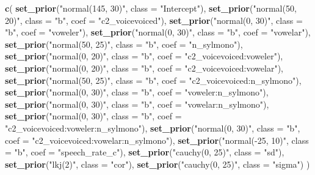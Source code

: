 \documentclass[11pt,]{article}
\newenvironment{Shaded}{\begin{snugshade}}{\end{snugshade}}
\newcommand{\DataTypeTok}[1]{\textcolor[rgb]{0.13,0.29,0.53}{#1}}
\newcommand{\KeywordTok}[1]{\textcolor[rgb]{0.13,0.29,0.53}{\textbf{#1}}}
\newcommand{\NormalTok}[1]{#1}
\newcommand{\StringTok}[1]{\textcolor[rgb]{0.31,0.60,0.02}{#1}}
\begin{document}
\begin{Shaded}
\begin{Highlighting}[]
\KeywordTok{c}\NormalTok{(}
  \KeywordTok{set_prior}\NormalTok{(}\StringTok{"normal(145, 30)"}\NormalTok{, }\DataTypeTok{class =} \StringTok{"Intercept"}\NormalTok{),}
  \KeywordTok{set_prior}\NormalTok{(}\StringTok{"normal(50, 20)"}\NormalTok{, }\DataTypeTok{class =} \StringTok{"b"}\NormalTok{, }\DataTypeTok{coef =} \StringTok{"c2_voicevoiced"}\NormalTok{),}
  \KeywordTok{set_prior}\NormalTok{(}\StringTok{"normal(0, 30)"}\NormalTok{, }\DataTypeTok{class =} \StringTok{"b"}\NormalTok{, }\DataTypeTok{coef =} \StringTok{"voweler"}\NormalTok{),}
  \KeywordTok{set_prior}\NormalTok{(}\StringTok{"normal(0, 30)"}\NormalTok{, }\DataTypeTok{class =} \StringTok{"b"}\NormalTok{, }\DataTypeTok{coef =} \StringTok{"vowelar"}\NormalTok{),}
  \KeywordTok{set_prior}\NormalTok{(}\StringTok{"normal(50, 25)"}\NormalTok{, }\DataTypeTok{class =} \StringTok{"b"}\NormalTok{, }\DataTypeTok{coef =} \StringTok{"n_sylmono"}\NormalTok{),}
  \KeywordTok{set_prior}\NormalTok{(}\StringTok{"normal(0, 20)"}\NormalTok{, }\DataTypeTok{class =} \StringTok{"b"}\NormalTok{, }\DataTypeTok{coef =} \StringTok{"c2_voicevoiced:voweler"}\NormalTok{),}
  \KeywordTok{set_prior}\NormalTok{(}\StringTok{"normal(0, 20)"}\NormalTok{, }\DataTypeTok{class =} \StringTok{"b"}\NormalTok{, }\DataTypeTok{coef =} \StringTok{"c2_voicevoiced:vowelar"}\NormalTok{),}
  \KeywordTok{set_prior}\NormalTok{(}\StringTok{"normal(50, 25)"}\NormalTok{, }\DataTypeTok{class =} \StringTok{"b"}\NormalTok{, }\DataTypeTok{coef =} \StringTok{"c2_voicevoiced:n_sylmono"}\NormalTok{),}
  \KeywordTok{set_prior}\NormalTok{(}\StringTok{"normal(0, 30)"}\NormalTok{, }\DataTypeTok{class =} \StringTok{"b"}\NormalTok{, }\DataTypeTok{coef =} \StringTok{"voweler:n_sylmono"}\NormalTok{),}
  \KeywordTok{set_prior}\NormalTok{(}\StringTok{"normal(0, 30)"}\NormalTok{, }\DataTypeTok{class =} \StringTok{"b"}\NormalTok{, }\DataTypeTok{coef =} \StringTok{"vowelar:n_sylmono"}\NormalTok{),}
  \KeywordTok{set_prior}\NormalTok{(}\StringTok{"normal(0, 30)"}\NormalTok{, }\DataTypeTok{class =} \StringTok{"b"}\NormalTok{, }\DataTypeTok{coef =} \StringTok{"c2_voicevoiced:voweler:n_sylmono"}\NormalTok{),}
  \KeywordTok{set_prior}\NormalTok{(}\StringTok{"normal(0, 30)"}\NormalTok{, }\DataTypeTok{class =} \StringTok{"b"}\NormalTok{, }\DataTypeTok{coef =} \StringTok{"c2_voicevoiced:vowelar:n_sylmono"}\NormalTok{),}
  \KeywordTok{set_prior}\NormalTok{(}\StringTok{"normal(-25, 10)"}\NormalTok{, }\DataTypeTok{class =} \StringTok{"b"}\NormalTok{, }\DataTypeTok{coef =} \StringTok{"speech_rate_c"}\NormalTok{),}
  \KeywordTok{set_prior}\NormalTok{(}\StringTok{"cauchy(0, 25)"}\NormalTok{, }\DataTypeTok{class =} \StringTok{"sd"}\NormalTok{),}
  \KeywordTok{set_prior}\NormalTok{(}\StringTok{"lkj(2)"}\NormalTok{, }\DataTypeTok{class =} \StringTok{"cor"}\NormalTok{),}
  \KeywordTok{set_prior}\NormalTok{(}\StringTok{"cauchy(0, 25)"}\NormalTok{, }\DataTypeTok{class =} \StringTok{"sigma"}\NormalTok{)}
\NormalTok{)}
\end{Highlighting}
\end{Shaded}
\end{document}
